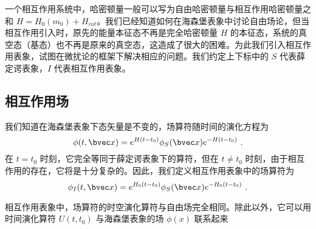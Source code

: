 
一个相互作用系统中，哈密顿量一般可以写为自由哈密顿量与相互作用哈密顿量之和 $H=H_0(m_0)+H_{int}$。我们已经知道如何在海森堡表象中讨论自由场论，但当相互作用引入时，原先的能量本征态不再是完全哈密顿量 $H$ 的本征态，系统的真空态（基态）也不再是原来的真空态，这造成了很大的困难。为此我们引入相互作用表象，试图在微扰论的框架下解决相应的问题。我们约定上下标中的 $S$ 代表薛定谔表象，$I$ 代表相互作用表象。
\subsection{相互作用场}
我们知道在海森堡表象下态矢量是不变的，场算符随时间的演化方程为
\begin{equation}
\phi(t,\bvec x)=e^{H(t-t_0)}\phi_S(\bvec x)e^{-H(t-t_0)}~.
\end{equation}
在 $t=t_0$ 时刻，它完全等同于薛定谔表象下的算符，但在 $t\neq t_0$ 时刻，由于相互作用的存在，它将是十分复杂的。因此，我们定义相互作用表象中的场算符为
\begin{equation}
\phi_I(t,\bvec x)=e^{H_0(t-t_0)}\phi_S(\bvec x)e^{-H_0(t-t_0)}~.
\end{equation}

相互作用表象中，场算符的时空演化算符与自由场完全相同。除此以外，它可以用时间演化算符 $U(t,t_0)$ 与海森堡表象的场 $\phi(x)$ 联系起来

